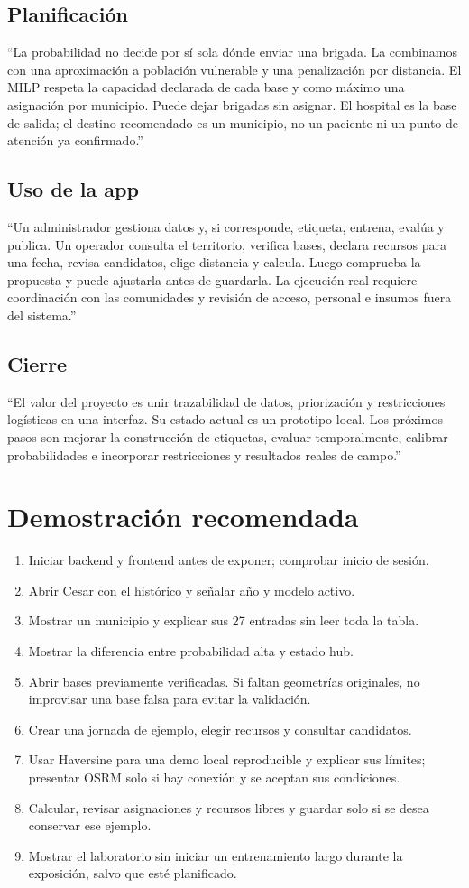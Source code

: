 \documentclass[11pt,a4paper]{report}
\begin{document}
\subsection*{Planificación}
``La probabilidad no decide por sí sola dónde enviar una brigada. La combinamos con una aproximación a población vulnerable y una penalización por distancia. El MILP respeta la capacidad declarada de cada base y como máximo una asignación por municipio. Puede dejar brigadas sin asignar. El hospital es la base de salida; el destino recomendado es un municipio, no un paciente ni un punto de atención ya confirmado.''

\subsection*{Uso de la app}
``Un administrador gestiona datos y, si corresponde, etiqueta, entrena, evalúa y publica. Un operador consulta el territorio, verifica bases, declara recursos para una fecha, revisa candidatos, elige distancia y calcula. Luego comprueba la propuesta y puede ajustarla antes de guardarla. La ejecución real requiere coordinación con las comunidades y revisión de acceso, personal e insumos fuera del sistema.''

\subsection*{Cierre}
``El valor del proyecto es unir trazabilidad de datos, priorización y restricciones logísticas en una interfaz. Su estado actual es un prototipo local. Los próximos pasos son mejorar la construcción de etiquetas, evaluar temporalmente, calibrar probabilidades e incorporar restricciones y resultados reales de campo.''

\section{Demostración recomendada}
\begin{enumerate}
\item Iniciar backend y frontend antes de exponer; comprobar inicio de sesión.
\item Abrir Cesar con el histórico y señalar año y modelo activo.
\item Mostrar un municipio y explicar sus 27 entradas sin leer toda la tabla.
\item Mostrar la diferencia entre probabilidad alta y estado hub.
\item Abrir bases previamente verificadas. Si faltan geometrías originales, no improvisar una base falsa para evitar la validación.
\item Crear una jornada de ejemplo, elegir recursos y consultar candidatos.
\item Usar Haversine para una demo local reproducible y explicar sus límites; presentar OSRM solo si hay conexión y se aceptan sus condiciones.
\item Calcular, revisar asignaciones y recursos libres y guardar solo si se desea conservar ese ejemplo.
\item Mostrar el laboratorio sin iniciar un entrenamiento largo durante la exposición, salvo que esté planificado.
\end{enumerate}
\end{document}
